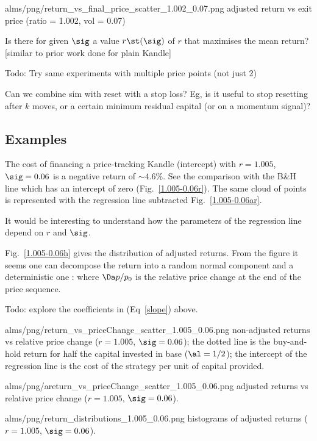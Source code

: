\documentclass[oneside,twocolumn,12pt]{article}
\begin{document}
\IG{150pt}
{alms/png/return_vs_final_price_scatter_1.002_0.07.png}
{adjusted return vs exit price (ratio = 1.002, vol = 0.07)}

\QS[1] Is there for given $\sig$ a value $r\st(\sig)$ of $r$ that maximises the mean return? [similar to prior work done
for plain Kandle]

Todo: Try same experiments with multiple price points (not just 2)

Can we combine sim with reset with a stop loss? Eg, is it useful to stop resetting after $k$ moves,
or a certain minimum residual capital (or on a momentum signal)?


\subsection{Examples}
The cost of financing a price-tracking Kandle (intercept) with $r=1.005$, $\sig=0.06$ is a negative return of 
$\sim 4.6\%$. See the comparison with the B\&H line which has an intercept of zero (Fig.~\ref{1.005-0.06r}).
The same cloud of points is represented with the regression line subtracted Fig.~\ref{1.005-0.06ar}.

It would be interesting to understand how the parameters of the regression line depend on $r$ and $\sig$.

Fig.~\ref{1.005-0.06h} gives the distribution of adjusted returns. 
From the figure it seems one can decompose the return into a random normal component
and a deterministic one      :
where $\Da p/p_0$ is the relative price change at the end of the price sequence.

Todo: explore the coefficients in (Eq~\ref{slope}) above.

\IG{150pt}
{alms/png/return_vs_priceChange_scatter_1.005_0.06.png}
{\label{1.005-0.06r} non-adjusted returns vs relative price change ($r=1.005$, $\sig=0.06$); the dotted line is the buy-and-hold
return for half the capital invested in base ($\al=1/2$); the intercept of the regression line 
is the cost of the strategy per unit of capital provided.}

\IG{150pt}
{alms/png/areturn_vs_priceChange_scatter_1.005_0.06.png}
{\label{1.005-0.06ar} adjusted returns vs relative price change ($r=1.005$, $\sig=0.06$).}

\IG{150pt}
{alms/png/return_distributions_1.005_0.06.png}
{\label{1.005-0.06h} histograms of adjusted returns ($r=1.005$, $\sig=0.06$).}
\end{document}
